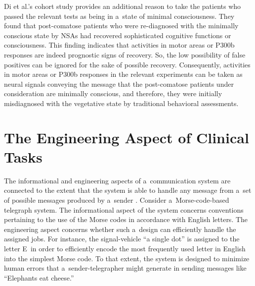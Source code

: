 Di et al.'s
\parencite*[][]{di_neuroimaging_2008} %
 cohort study provides an additional reason to take the patients who passed the relevant tests as being in a~state of minimal consciousness. They found that post-comatose patients who were re-diagnosed with the minimally conscious state by NSAs had recovered sophisticated cognitive functions or consciousness. This finding indicates that activities in motor areas or P300b responses are indeed prognostic signs of recovery. So, the low possibility of false positives can be ignored for the sake of possible recovery. Consequently, activities in motor areas or P300b responses in the relevant experiments can be taken as neural signals conveying the message that the post-comatose patients under consideration are minimally conscious, and therefore, they were initially misdiagnosed with the vegetative state by traditional behavioral assessments.

\section{The Engineering Aspect of Clinical Tasks}
The informational and engineering aspects of a~communication system are connected to the extent that the system is able to handle any message from a~set of possible messages produced by a~sender
\parencite[][p.270]{weaver_recent_1953}. %
 Consider a~Morse-code-based telegraph system. The informational aspect of the system concerns conventions pertaining to the use of the Morse codes in accordance with English letters. The engineering aspect concerns whether such a~design can efficiently handle the assigned jobs. For instance, the signal-vehicle ``a single dot'' is assigned to the letter E~in order to efficiently encode the most frequently used letter in English into the simplest Morse code. To that extent, the system is designed to minimize human errors that a~sender-telegrapher might generate in sending messages like ``Elephants eat cheese.''

